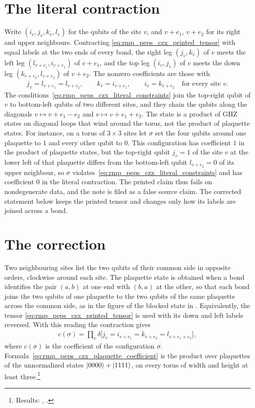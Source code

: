\documentclass{article}
\begin{document}
\section{The literal contraction}
Write $(i_v,j_v,k_v,l_v)$ for the qubits of the site $v$, and $v+e_1$,
$v+e_2$ for its right and upper neighbours. Contracting
\eqref{eq:rmp_peps_czx_printed_tensor} with equal labels at the two ends of
every bond, the
right leg $(j_v,k_v)$ of $v$ meets the left leg $(l_{v+e_1},i_{v+e_1})$ of
$v+e_1$, and the top leg $(i_v,j_v)$ of $v$ meets the down leg
$(k_{v+e_2},l_{v+e_2})$ of $v+e_2$. The nonzero coefficients are those with
\begin{align}
    j_v=l_{v+e_1}=l_{v+e_2},\qquad k_v=i_{v+e_1},\qquad i_v=k_{v+e_2}
    \quad\text{for every site } v.
    \label{eq:rmp_peps_czx_literal_constraints}
\end{align}
The conditions~\eqref{eq:rmp_peps_czx_literal_constraints} join the
top-right qubit of $v$ to bottom-left qubits of two different sites, and they
chain the qubits along the diagonals
$v\mapsto v+e_1-e_2$ and $v\mapsto v+e_1+e_2$. The state is a product of
GHZ states on diagonal loops that wind around the torus, not the product of
plaquette states. For instance, on a torus of $3\times 3$ sites let $\sigma$ set
the four qubits around one plaquette to $1$ and every other qubit to $0$.
This configuration has coefficient $1$ in the product of plaquette states,
but the top-right qubit $j_v=1$ of the site $v$ at the lower left of that
plaquette differs from the bottom-left qubit $l_{v+e_2}=0$ of its upper
neighbour, so $\sigma$ violates~\eqref{eq:rmp_peps_czx_literal_constraints}
and has coefficient $0$ in the literal contraction. The printed claim thus
fails on nondegenerate data, and the note is filed as a false source claim.
The corrected statement below keeps the printed tensor and changes only how
its labels are joined across a bond.

\section{The correction}
Two neighbouring sites list the two qubits of their common side in opposite
orders, clockwise around each site. The plaquette state is obtained when a
bond identifies the pair $(a,b)$ at one end with $(b,a)$ at the other, so
that each bond joins the two qubits of one plaquette to the two qubits of the
same plaquette across the common side, as in the figure of the blocked state
in \cite{Cirac2021Matrix}. Equivalently, the tensor
\eqref{eq:rmp_peps_czx_printed_tensor} is used with its down and left labels
reversed. With this reading the contraction gives
\begin{align}
    c(\sigma)=\prod_{v}\delta\bigl[j_v=i_{v+e_1}=k_{v+e_2}
    =l_{v+e_1+e_2}\bigr],
    \label{eq:rmp_peps_czx_plaquette_coefficient}
\end{align}
where $c(\sigma)$ is the coefficient of the configuration $\sigma$.
Formula~\eqref{eq:rmp_peps_czx_plaquette_coefficient} is the product over
plaquettes of the
unnormalized states
$|0000\rangle+|1111\rangle$, on every torus of width and height at least
three.\footnote{Results: ,
    .}
\end{document}
